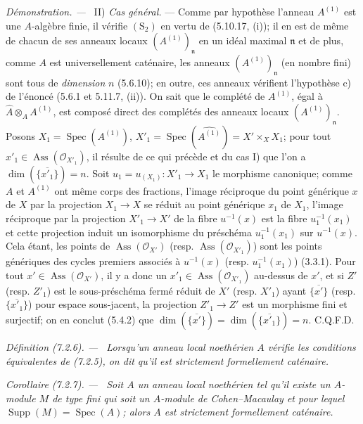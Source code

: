 \documentclass[10pt,oneside]{book}
\newcommand{\oldpage}[2][]{%
  \setcounter{footnote}{0}%
  \marginpar{\scriptsize\textbf{#1}~|~#2}\ignorespaces}
\newenvironment{definition}[1][]{%
  \par\medskip\noindent\itshape Définition (#1). ---\ }{\par}
\newenvironment{corollary}[1][]{%
  \par\medskip\noindent\itshape Corollaire (#1). ---\ }{\par}
\newenvironment{proof}{%
  \par\medskip\noindent\textit{Démonstration. ---\ }}{\par}
\begin{document}
\begin{proof}
\medskip\noindent
II) \emph{Cas général.} --- Comme par hypothèse l'anneau $A^{(1)}$ est une
$A$-algèbre finie, il vérifie $(\mathrm S_2)$ en vertu de (5.10.17, (i));
il en est de même de chacun de ses anneaux locaux
$(A^{(1)})_{\mathfrak n}$ en un idéal maximal $\mathfrak n$ et de plus,
comme $A$ est universellement caténaire, les anneaux
$(A^{(1)})_{\mathfrak n}$ (en nombre fini) sont tous de \emph{dimension}
$n$ (5.6.10); en outre, ces anneaux vérifient l'hypothèse c) de l'énoncé
(5.6.1 et 5.11.7, (ii)). On sait que le complété de $A^{(1)}$, égal à
$\widehat A\otimes_AA^{(1)}$, est composé direct des complétés des anneaux
locaux $(A^{(1)})_{\mathfrak n}$. Posons
$X_1=\operatorname{Spec}(A^{(1)})$,
$X'_1=\operatorname{Spec}(\widehat{A^{(1)}})=X'\times_XX_1$; pour tout
$x'_1\in\operatorname{Ass}(\mathscr O_{X'_1})$, il résulte de ce qui
précède et du cas I) que l'on a $\dim(\overline{\{x'_1\}})=n$. Soit
$u_1=u_{(X_1)}:X'_1\to X_1$ le morphisme canonique; comme $A$ et $A^{(1)}$
ont même corps des fractions, l'image réciproque du point générique $x$ de
$X$ par la projection $X_1\to X$ se réduit au point générique $x_1$ de
$X_1$, l'image réciproque par la projection $X'_1\to X'$ de la fibre
$u^{-1}(x)$ est la fibre $u_1^{-1}(x_1)$ et cette projection induit un
isomorphisme du préschéma $u_1^{-1}(x_1)$ sur $u^{-1}(x)$. Cela étant, les
points de $\operatorname{Ass}(\mathscr O_{X'})$ (resp.
$\operatorname{Ass}(\mathscr O_{X'_1})$) sont les points génériques des
cycles premiers associés à $u^{-1}(x)$ (resp. $u_1^{-1}(x_1)$) (3.3.1).
Pour tout $x'\in\operatorname{Ass}(\mathscr O_{X'})$, il y a donc un
$x'_1\in\operatorname{Ass}(\mathscr O_{X'_1})$ au-dessus de $x'$, et si
$Z'$ (resp. $Z'_1$) est le sous-préschéma fermé réduit de $X'$ (resp.
$X'_1$) ayant $\overline{\{x'\}}$ (resp. $\overline{\{x'_1\}}$) pour
espace sous-jacent, la projection $Z'_1\to Z'$ est un morphisme fini et
surjectif; on en conclut (5.4.2) que
$\dim(\overline{\{x'\}})=\dim(\overline{\{x'_1\}})=n$. C.Q.F.D.
\end{proof}

\begin{definition}[7.2.6]
\label{IV.2.s7.2.6-fr}
Lorsqu'un anneau local noethérien $A$ vérifie les conditions équivalentes de
(7.2.5), on dit qu'il est \emph{strictement formellement caténaire}.
\end{definition}

\oldpage[IV-2]{192}

\begin{corollary}[7.2.7]
\label{IV.2.s7.2.7-fr}
Soit $A$ un anneau local noethérien tel qu'il existe un $A$-module $M$ de
type fini qui soit un $A$-module de Cohen--Macaulay et pour lequel
$\operatorname{Supp}(M)=\operatorname{Spec}(A)$; alors $A$ est strictement
formellement caténaire.
\end{corollary}
\end{document}
